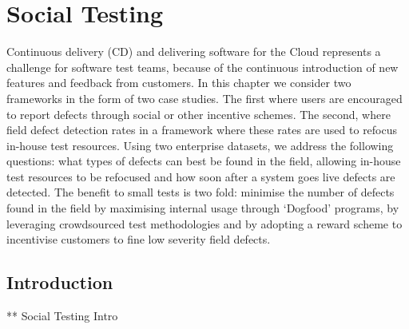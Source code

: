 
\chapter{Social Testing} %
\label{ch:ST}

\begin{textsl}
{\small Continuous delivery (CD) and delivering software for the Cloud represents a challenge for software test teams, because of the continuous introduction of new features and feedback from customers.  In this chapter we consider two frameworks in the form of two case studies. The first where users are encouraged to report defects through social or other incentive schemes. The second, where field defect detection rates in a framework where these rates are used to refocus in-house test resources. Using two enterprise datasets, we address the following questions: what types of defects can best be found in the field, allowing in-house test resources to be refocused and how soon after a system goes live defects are detected. The benefit to small tests is two fold: minimise the number of defects found in the field by maximising internal usage through `Dogfood' programs, by leveraging crowdsourced test methodologies and by adopting a reward scheme to incentivise customers to fine low severity field defects.}
\end{textsl}

\vspace*{1cm}




\section{Introduction}

** Social Testing Intro

